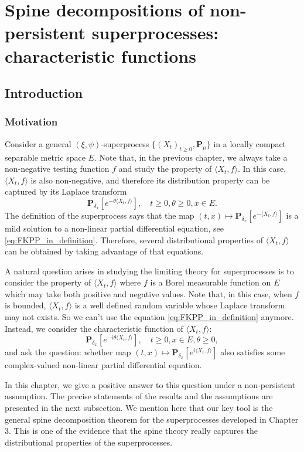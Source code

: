 \documentclass[UTF8]{pkuthss}
\theoremstyle{plain}
\theoremstyle{definition}
\numberwithin{equation}{section}
\begin{document}
\chapter{Spine decompositions of non-persistent superprocesses: characteristic functions}
\section{Introduction}
\subsection{Motivation}
    Consider a general $(\xi,\psi)$-superprocess $\{(X_t)_{t\geq 0}, \mathbf P_\mu\}$ in a locally compact separable metric space $E$.
    Note that, in the previous chapter, we always take a non-negative testing function $f$ and study the property of $\langle X_t,f\rangle$.
    In this case, $\langle X_t,f\rangle$ is also non-negative, and therefore its distribution property can be captured by its Laplace transform 
\[
    \mathbf P_{\delta_x}[e^{-\theta\langle X_t,f\rangle}],\quad t\geq 0, \theta \geq 0, x\in E.
\] 
    The definition of the superprocess says that the map $(t,x)\mapsto \mathbf P_{\delta_x}[e^{- \langle X_t,f\rangle}]$ is a mild solution to a non-linear partial differential equation, see \eqref{eq:FKPP_in_definition}.
    Therefore, several distributional properties of $\langle X_t,f\rangle$ can be obtained by taking advantage of that equations.

    A natural question arises in studying the limiting theory for superprocesses is to consider the property of $\langle X_t,f\rangle$ where $f$ is a Borel measurable function on $E$ which may take both positive and negative values.
    Note that, in this case, when $f$ is bounded, $\langle X_t,f\rangle$ is a well defined random variable whose Laplace transform may not exists. 
    So we can't use the equation \eqref{eq:FKPP_in_definition} anymore.
    Instead, we consider the characteristic function of $\langle X_t,f\rangle$:
\[
    \mathbf P_{\delta_x}[e^{-i\theta \langle X_t,f\rangle}],\quad t\geq 0, x\in E, \theta \geq 0,
\]
    and ask the question: whether map $(t,x)\mapsto \mathbf P_{\delta_x}[e^{i\langle X_t,f\rangle}]$ also satisfies some complex-valued non-linear partial differential equation.

    In this chapter, we give a positive answer to this question under a non-persistent assumption.
    The precise statements of the results and the assumptions are presented in the next subsection.
    We mention here that our key tool is the general spine decomposition theorem for the superprocesses developed in Chapter 3. 
    This is one of the evidence that the spine theory really captures the distributional properties of the superprocesses. 
\end{document}

